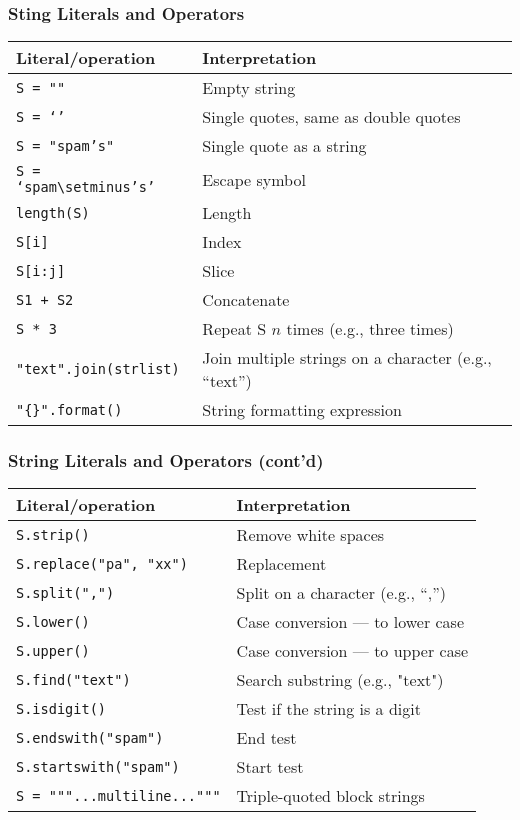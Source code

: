 \documentclass[aspectratio=1610]{beamer}
\begin{document}
\begin{frame}
    \frametitle{Sting Literals and Operators}
    \begin{table}[!htbp]
    	\centering
    	\begin{tabular}{ll}
    		\toprule \toprule
    		Literal/operation & Interpretation \\
    		\midrule
    		\texttt{S = ""} &  Empty string \\
    		\texttt{S = `'} &   Single quotes, same as double quotes \\
    		\texttt{S = "spam's"} & Single quote as a string \\
    		\texttt{S = `spam$\setminus$'s'} & Escape symbol \\
    		\texttt{length(S)} & Length \\
    		\texttt{S[i]} & Index \\
    		\texttt{S[i:j]} & Slice \\
    		\texttt{S1 + S2} & Concatenate \\
    		\texttt{S * 3} & Repeat S $n$ times (e.g., three times)\\
    		\texttt{"text".join(strlist)} & Join multiple strings on a character (e.g., ``text'')\\
    		\texttt{"\{\}".format()} & String formatting expression \\ 
   		\bottomrule
    	\end{tabular}
    \end{table}
\end{frame}

\begin{frame}
    \frametitle{String Literals and Operators (cont'd)}	
    \begin{table}[!htbp]
        \centering
        \begin{tabular}{ll}
    		\toprule \toprule
    		Literal/operation & Interpretation \\
    		\midrule
     		\texttt{S.strip()} & Remove white spaces \\
    		\texttt{S.replace("pa", "xx")} & Replacement \\
    		\texttt{S.split(",")} & Split on a character (e.g., ``,'') \\
    		\texttt{S.lower()} & Case conversion --- to lower case \\
    		\texttt{S.upper()} & Case conversion --- to upper case \\
            \texttt{S.find("text")} & Search substring (e.g., "text") \\
    		\texttt{S.isdigit()} & Test if the string is a digit \\
    		\texttt{S.endswith("spam")} & End test \\
            \texttt{S.startswith("spam")} & Start test \\
    		\texttt{S = """...multiline..."""} & Triple-quoted block strings \\
    		\bottomrule
    	\end{tabular}
    \end{table}
\end{frame}
\end{document}

